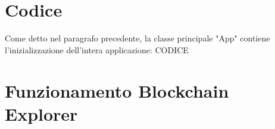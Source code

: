 \section{Codice}
\label{sec:codice}
Come detto nel paragrafo precedente, la classe principale "App" contiene l'inizializzazione dell'intera applicazione:
CODICE 
\section{Funzionamento Blockchain Explorer}
\label{sec:Funzionamento Blockchain Explorer}